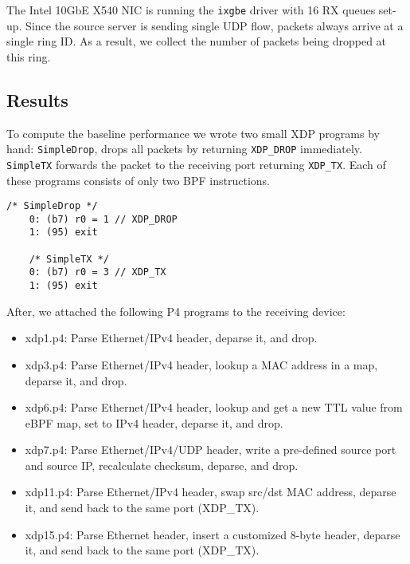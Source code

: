 The Intel 10GbE X540 NIC is running the \texttt{ixgbe} driver with 16 RX queues
set-up. Since the source server is sending single UDP flow, packets
always arrive at a single ring ID.  As a result, we collect the number
of packets being dropped at this ring.

\subsection{Results}

To compute the baseline performance we wrote two small XDP programs by
hand: \texttt{SimpleDrop}, drops all packets by returning
\texttt{XDP\_DROP} immediately.  \texttt{SimpleTX} forwards the packet
to the receiving port returning \texttt{XDP\_TX}.  Each of these
programs consists of only two BPF instructions.

\begin{lstlisting}[frame=none]
    /* SimpleDrop */
    0: (b7) r0 = 1 // XDP_DROP
    1: (95) exit

    /* SimpleTX */
    0: (b7) r0 = 3 // XDP_TX
    1: (95) exit
\end{lstlisting}

After, we attached the following P4 programs to the receiving device:
\begin{itemize}
\item xdp1.p4: Parse Ethernet/IPv4 header, deparse it, and drop.
\item xdp3.p4: Parse Ethernet/IPv4 header, lookup a MAC address
in a map, deparse it, and drop.
\item xdp6.p4: Parse Ethernet/IPv4 header, lookup and get a new TTL value
from eBPF map, set to IPv4 header, deparse it, and drop.
\item xdp7.p4: Parse Ethernet/IPv4/UDP header, write a pre-defined source port
and source IP, recalculate checksum, deparse, and drop.
\item xdp11.p4: Parse Ethernet/IPv4 header, swap src/dst MAC address,
deparse it, and send back to the same port (XDP\_TX).
\item xdp15.p4: Parse Ethernet header, insert a customized 8-byte header,
deparse it, and send back to the same port (XDP\_TX).
\end{itemize}

